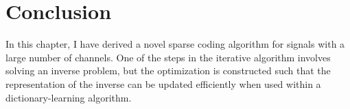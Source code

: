 \section{Conclusion}
In this chapter, I have derived a novel sparse coding algorithm for signals with a large number of channels. One of the steps in the iterative algorithm involves solving an inverse problem, but the optimization is constructed such that the representation of the inverse can be updated efficiently when used within a dictionary-learning algorithm.

